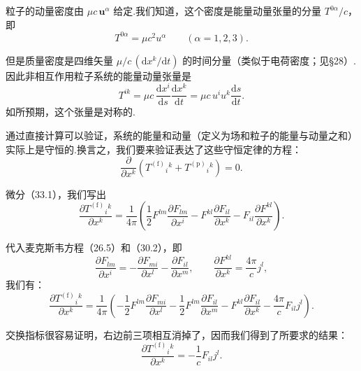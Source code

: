 粒子的动量密度由 $\mu c\,\boldsymbol{u}^\alpha$ 给定.我们知道，这个密度是能量动量张量的分量
$T^{0\alpha}/c$，即
\begin{equation*}
  T^{0\alpha}=\mu c^2u^\alpha\qquad(\alpha=1,2,3).
\end{equation*}

但是质量密度是四维矢量
$\mu/c\,(\mathrm{d}x^k/\mathrm{d}t)$
的时间分量（类似于电荷密度；见§28）.因此非相互作用粒子系统的能量动量张量是
\begin{equation}
  T^{ik}=\mu c\,\frac{\mathrm{d}x^i}{\mathrm{d}s}\frac{\mathrm{d}x^k}{\mathrm{d}t}
  =\mu c\,u^iu^k\frac{\mathrm{d}s}{\mathrm{d}t}.
\end{equation}
如所预期，这个张量是对称的.

通过直接计算可以验证，系统的能量和动量（定义为场和粒子的能量与动量之和）实际上是守恒的.换言之，我们要来验证表达了这些守恒定律的方程：
\begin{equation}
  \frac{\partial}{\partial x^k}
  \left({T^{(\mathrm{f})}}_i{}^k+{T^{(\mathrm{p})}}_i{}^k\right)=0.
\end{equation}

微分（33.1），我们写出
\begin{equation*}
  \frac{\partial {T^{(\mathrm{f})}}_i{}^k}{\partial x^k}
  =\frac{1}{4\pi}\left(\frac{1}{2}F^{lm}\frac{\partial F_{lm}}{\partial x^i}
  -F^{kl}\frac{\partial F_{il}}{\partial x^k}
  -F_{il}\frac{\partial F^{kl}}{\partial x^k}\right).
\end{equation*}

代入麦克斯韦方程（26.5）和（30.2），即
\begin{equation*}
  \frac{\partial F_{lm}}{\partial x^i}
  =-\frac{\partial F_{mi}}{\partial x^l}
  -\frac{\partial F_{il}}{\partial x^m},\qquad
  \frac{\partial F^{kl}}{\partial x^k}=\frac{4\pi}{c}j^l,
\end{equation*}
我们有：
\begin{equation*}
  \frac{\partial {T^{(\mathrm{f})}}_i{}^k}{\partial x^k}
  =\frac{1}{4\pi}\left(
  -\frac{1}{2}F^{lm}\frac{\partial F_{mi}}{\partial x^l}
  -\frac{1}{2}F^{lm}\frac{\partial F_{il}}{\partial x^m}
  -F^{kl}\frac{\partial F_{il}}{\partial x^k}
  -\frac{4\pi}{c}F_{il}j^l\right).
\end{equation*}

交换指标很容易证明，右边前三项相互消掉了，因而我们得到了所要求的结果：
\begin{equation}
  \frac{\partial {T^{(\mathrm{f})}}_i{}^k}{\partial x^k}
  =-\frac{1}{c}F_{il}j^l.
\end{equation}

